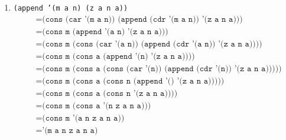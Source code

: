\documentclass[letterpaper,11pt]{article}
\begin{document}
\begin{enumerate}
\begin{enumerate}
        \item \texttt{(append '(m a n) (z a n a))}
        \begin{align*}
            &= \texttt{(cons (car '(m a n)) (append (cdr '(m a n)) '(z a n a)))} \\
            &= \texttt{(cons m (append '(a n) '(z a n a)))} \\
            &= \texttt{(cons m (cons (car '(a n)) (append (cdr '(a n)) '(z a n a))))} \\
            &= \texttt{(cons m (cons a (append '(n) '(z a n a))))} \\
            &= \texttt{(cons m (cons a (cons (car '(n)) (append (cdr '(n)) '(z a n a)))))} \\
            &= \texttt{(cons m (cons a (cons n (append '() '(z a n a)))))} \\
            &= \texttt{(cons m (cons a (cons n '(z a n a))))} \\
            &= \texttt{(cons m (cons a '(n z a n a)))} \\
            &= \texttt{(cons m '(a n z a n a))} \\
            &= \texttt{'(m a n z a n a)}
        \end{align*}


\end{enumerate}
\end{enumerate}
\end{document}
